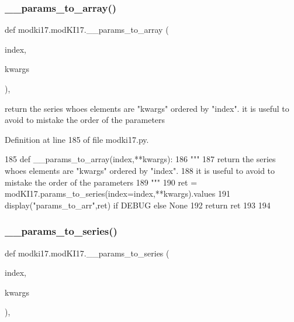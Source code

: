 \subsubsection{\texorpdfstring{\+\_\+\+\_\+params\+\_\+to\+\_\+array()}{\_\_params\_to\_array()}}
{\footnotesize\ttfamily def modki17.\+mod\+K\+I17.\+\_\+\+\_\+params\+\_\+to\+\_\+array (\begin{DoxyParamCaption}\item[{}]{index,  }\item[{}]{kwargs }\end{DoxyParamCaption})\hspace{0.3cm}{\ttfamily [static]}, {\ttfamily [private]}}

\begin{DoxyVerb}return the series whoes elements are "kwargs" ordered by "index".
it is useful to avoid to mistake the order of the parameters
\end{DoxyVerb}
 

Definition at line 185 of file modki17.\+py.


\begin{DoxyCode}
185     \textcolor{keyword}{def }\_\_params\_to\_array(index,**kwargs):
186         \textcolor{stringliteral}{"""}
187 \textcolor{stringliteral}{        return the series whoes elements are "kwargs" ordered by "index".}
188 \textcolor{stringliteral}{        it is useful to avoid to mistake the order of the parameters}
189 \textcolor{stringliteral}{        """}
190         ret = modKI17.params\_to\_series(index=index,**kwargs).values
191         display(\textcolor{stringliteral}{"params\_to\_arr"},ret) \textcolor{keywordflow}{if} DEBUG \textcolor{keywordflow}{else} \textcolor{keywordtype}{None}
192         \textcolor{keywordflow}{return} ret
193     
194     
\end{DoxyCode}
\mbox{\label{classmodki17_1_1modKI17_a653d564d2d311c30ed95eacb6503432b}} 
\subsubsection{\texorpdfstring{\+\_\+\+\_\+params\+\_\+to\+\_\+series()}{\_\_params\_to\_series()}}
{\footnotesize\ttfamily def modki17.\+mod\+K\+I17.\+\_\+\+\_\+params\+\_\+to\+\_\+series (\begin{DoxyParamCaption}\item[{}]{index,  }\item[{}]{kwargs }\end{DoxyParamCaption})\hspace{0.3cm}{\ttfamily [static]}, {\ttfamily [private]}}

